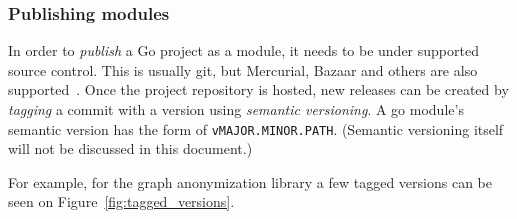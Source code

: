 


\subsubsection{Publishing modules}

In order to \emph{publish} a Go project as a module, it needs to be under supported source control. This is usually git, but Mercurial, Bazaar and others are also supported~\cite{publish-go-modules}. Once the project repository is hosted, new releases can be created by \emph{tagging} a commit with a version using \emph{semantic versioning}. A go module's semantic version has the form of \texttt{vMAJOR.MINOR.PATH}. (Semantic versioning itself will not be discussed in this document.)

For example, for the graph anonymization library a few tagged versions can be seen on Figure~\ref{fig:tagged_versions}.
